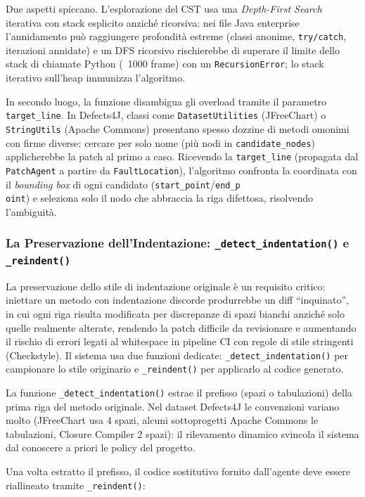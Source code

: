 Due aspetti spiccano. L'esplorazione del CST usa una \textit{Depth-First Search} iterativa con stack esplicito
anziché ricorsiva: nei file Java enterprise l'annidamento può raggiungere profondità estreme (classi anonime,
\texttt{try/catch}, iterazioni annidate) e un DFS ricorsivo rischierebbe di superare il limite dello stack di
chiamate Python (~1000 frame) con un \texttt{RecursionError}; lo stack iterativo sull'heap immunizza l'algoritmo.

In secondo luogo, la funzione disambigua gli overload tramite il parametro \texttt{target\_line}. In Defects4J,
classi come \texttt{DatasetUtilities} (JFreeChart) o \texttt{StringUtils} (Apache Commons) presentano spesso dozzine
di metodi omonimi con firme diverse: cercare per solo nome (più nodi in \texttt{candidate\_nodes}) applicherebbe la
patch al primo a caso. Ricevendo la \texttt{target\_line} (propagata dal \texttt{PatchAgent} a partire da
\texttt{FaultLocation}), l'algoritmo confronta la coordinata con il \textit{bounding box} di ogni candidato
(\texttt{start\_point}/\texttt{end\_p\\oint}) e seleziona solo il nodo che abbraccia la riga difettosa, risolvendo l'ambiguità.

\subsubsection{La Preservazione dell'Indentazione: \texttt{\_detect\_indentation()} e \texttt{\_reindent()}}
\label{subsubsec:3.4.6.5}
La preservazione dello stile di indentazione originale è un requisito critico: iniettare un metodo con
indentazione discorde produrrebbe un diff ``inquinato'', in cui ogni riga risulta modificata per discrepanze di
spazi bianchi anziché solo quelle realmente alterate, rendendo la patch difficile da revisionare e aumentando il
rischio di errori legati al whitespace in pipeline CI con regole di stile stringenti (Checkstyle). Il sistema usa
due funzioni dedicate: \texttt{\_detect\_indentation()} per campionare lo stile originario e \texttt{\_reindent()}
per applicarlo al codice generato.

La funzione \texttt{\_detect\_indentation()} estrae il prefisso (spazi o tabulazioni) della prima riga del metodo
originale. Nel dataset Defects4J le convenzioni variano molto (JFreeChart usa 4 spazi, alcuni sottoprogetti Apache
Commons le tabulazioni, Closure Compiler 2 spazi): il rilevamento dinamico svincola il sistema dal conoscere a
priori le policy del progetto.

Una volta estratto il prefisso, il codice sostitutivo fornito
dall'agente deve essere riallineato tramite \texttt{\_reindent()}:

